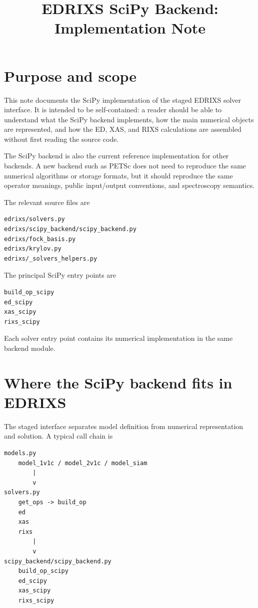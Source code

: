 \documentclass[11pt]{article}
\title{EDRIXS SciPy Backend: Implementation Note}
\author{}
\begin{document}
\maketitle
\tableofcontents
\newpage

\section{Purpose and scope}

This note documents the SciPy implementation of the staged EDRIXS solver interface.  It is intended to be self-contained: a reader should be able to understand what the SciPy backend implements, how the main numerical objects are represented, and how the ED, XAS, and RIXS calculations are assembled without first reading the source code.

The SciPy backend is also the current reference implementation for other backends.  A new backend such as PETSc does not need to reproduce the same numerical algorithms or storage formats, but it should reproduce the same operator meanings, public input/output conventions, and spectroscopy semantics.

The relevant source files are

\begin{lstlisting}
edrixs/solvers.py
edrixs/scipy_backend/scipy_backend.py
edrixs/fock_basis.py
edrixs/krylov.py
edrixs/_solvers_helpers.py
\end{lstlisting}

The principal SciPy entry points are

\begin{lstlisting}
build_op_scipy
ed_scipy
xas_scipy
rixs_scipy
\end{lstlisting}

Each solver entry point contains its numerical implementation in the same backend module.

\section{Where the SciPy backend fits in EDRIXS}

The staged interface separates model definition from numerical representation and solution.  A typical call chain is

\begin{lstlisting}
models.py
    model_1v1c / model_2v1c / model_siam
        |
        v
solvers.py
    get_ops -> build_op
    ed
    xas
    rixs
        |
        v
scipy_backend/scipy_backend.py
    build_op_scipy
    ed_scipy
    xas_scipy
    rixs_scipy
\end{lstlisting}
\end{document}
